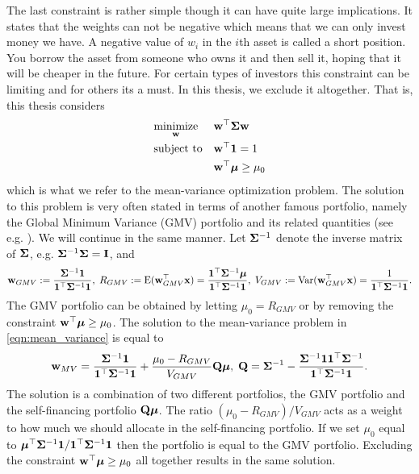 \documentclass[]{book}\usepackage{knitr}
\begin{document}
The last constraint is rather simple though it can have quite large implications. 
It states that the weights can not be negative which means that we can only invest money we have. 
A negative value of $w_i$ in the $i$th asset is called a short position.
You borrow the asset from someone who owns it and then sell it, hoping that it will be cheaper in the future.
For certain types of investors this constraint can be limiting and for others its a must.
In this thesis, we exclude it altogether. That is, this thesis considers
\begin{equation}\label{eqn:mean_variance}
\begin{aligned}
& \underset{\mathbf{w}}{\text{minimize}} 
& & \mathbf{w}^\top \mathbf{\Sigma} \mathbf{w} \\
& \text{subject to}
& & \mathbf{w}^\top \mathbf{1} = 1 \\
& && \mathbf{w}^\top \mbox{\boldmath$\mu$} \geq \mu_0 \\
\end{aligned}
\end{equation}
which is what we refer to the mean-variance optimization problem. The solution to this problem is very often stated in terms of another famous portfolio, namely the Global Minimum Variance (GMV) portfolio and its related quantities (see e.g. \textcite{Bodnar2009CaIotEFiEM, bodnar2013equivalence, bauder2018bayesian}). We will continue in the same manner. Let $\mathbf{\Sigma}^{-1}$ denote the inverse matrix of $\mathbf{\Sigma}$, e.g. $\mathbf{\Sigma}^{-1}\mathbf{\Sigma} = \mathbf{I}$, and
\begin{equation}
	\mathbf{w}_{GMV} := \frac{\mathbf{\Sigma}^{-1}\mathbf{1}}{\mathbf{1}^\top \mathbf{\Sigma}^{-1}\mathbf{1}}, \; R_{GMV} :=\operatorname{E}(\mathbf{w}_{GMV}^\top\mathbf{x}) = \frac{\mathbf{1}^\top\mathbf{\Sigma}^{-1}\mbox{\boldmath$\mu$}}{\mathbf{1}^\top \mathbf{\Sigma}^{-1}\mathbf{1}}, \;
	V_{GMV} := \operatorname{Var}(\mathbf{w}_{GMV}^\top\mathbf{x}) =\frac{1}{\mathbf{1}^\top \mathbf{\Sigma}^{-1}\mathbf{1}}.
\end{equation}
The GMV portfolio can be obtained by letting $\mu_0=R_{GMV}$ or by removing the constraint $\mathbf{w}^\top \mbox{\boldmath$\mu$} \geq \mu_0$. The solution to the mean-variance problem in \eqref{eqn:mean_variance} is equal to
\begin{equation}\label{eqn:mean_var_solution}
	\mathbf{w}_{MV} = \frac{\mathbf{\Sigma}^{-1}\mathbf{1}}{\mathbf{1}^\top \mathbf{\Sigma}^{-1}\mathbf{1}} + \frac{\mu_0 - R_{GMV}}{V_{GMV}} \mathbf{Q} \mbox{\boldmath$\mu$},\; \mathbf{Q} = \mathbf{\Sigma}^{-1} - \frac{\mathbf{\Sigma}^{-1} \mathbf{1} \mathbf{1}^\top \mathbf{\Sigma}^{-1}}{\mathbf{1}^\top \mathbf{\Sigma}^{-1} \mathbf{1}}.
\end{equation}
The solution is a combination of two different portfolios, the GMV portfolio and the self-financing portfolio $\mathbf{Q} \mbox{\boldmath$\mu$}$. The ratio $(\mu_0 - R_{GMV})/V_{GMV}$ acts as a weight to how much we should allocate in the self-financing portfolio. If we set $\mu_0$ equal to $\mbox{\boldmath$\mu$}^\top \mathbf{\Sigma}^{-1} \mathbf{1} / \mathbf{1}^\top \mathbf{\Sigma}^{-1} \mathbf{1}$ then the portfolio is equal to the GMV portfolio. Excluding the constraint $\mathbf{w}^\top \mbox{\boldmath$\mu$} \geq \mu_0$ all together results in the same solution. 
\end{document}
